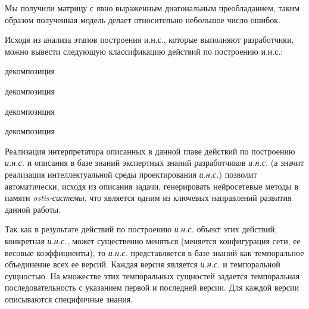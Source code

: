 \begin{textitemize}
Мы получили матрицу с явно выраженным диагональным преобладанием, таким образом полученная модель делает относительно небольшое число ошибок.
\end{textitemize}

Исходя из анализа этапов построения и.н.с., которые выполняют разработчики, можно вывести следующую классификацию действий по построению и.н.с.:

\begin{SCn}
	\begin{scnrelfromset}{декомпозиция}
		\begin{scnrelfromset}{декомпозиция}
		\end{scnrelfromset}

		\begin{scnrelfromset}{декомпозиция}
		\end{scnrelfromset}

		\begin{scnrelfromset}{декомпозиция}
		\end{scnrelfromset}
	\end{scnrelfromset}
\end{SCn}

Реализация интерпретатора описанных в данной главе действий по построению \textit{и.н.с.} и описания в базе знаний экспертных знаний разработчиков\textit{ и.н.с.} (а значит реализация интеллектуальной среды проектирования \textit{и.н.с.}) позволит автоматически, исходя из описания задачи, генерировать нейросетевые методы в памяти \textit{ostis-системы}, что является одним из ключевых направлений развития данной работы.

Так как в результате действий по построению \textit{и.н.с.} объект этих действий, конкретная \textit{и.н.с.}, может существенно меняться (меняется конфигурация сети, ее весовые коэффициенты), то \textit{и.н.с.} представляется в базе знаний как темпоральное объединение всех ее версий. Каждая версия является \textit{и.н.с.} и темпоральной сущностью. На множестве этих темпоральных сущностей задается темпоральная последовательность с указанием первой и последней версии. Для каждой версии описываются специфичные знания.

